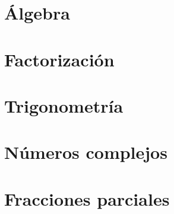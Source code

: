 \documentclass{tufte-book}
\begin{document}
\chapter{Álgebra}









\chapter{Factorización}







\chapter{Trigonometría}



\chapter{Números complejos}


\chapter{Fracciones parciales}




%
{}

\end{document}

